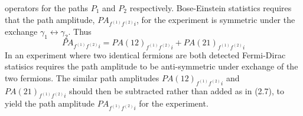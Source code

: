 {   operators for the paths  $P_1$ and $P_2$ respectively. Bose-Einstein statistics requires that the 
   path amplitude, $PA_{f^{(1)}f^{(2)}i}$, for the experiment is symmetric under
   the exchange $\gamma_1 \leftrightarrow \gamma_2$.
   Thus 
  \begin{equation}
    PA_{f^{(1)}f^{(2)}i} =  PA(12)_{f^{(1)}f^{(2)}i} +  PA(21)_{f^{(1)}f^{(2)}i}
   \end{equation}
   In an experiment where two identical fermions are both detected Fermi-Dirac statisics
    requires the path amplitude to be anti-symmetric under exchange of the two fermions. The similar
    path amplitudes  $PA(12)_{f^{(1)}f^{(2)}i}$ and  $PA(21)_{f^{(1)}f^{(2)}i}$ should then be subtracted rather than
   added as in (2.7), to yield the path amplitude $PA_{f^{(1)}f^{(2)}i}$ for the experiment.
 
}
